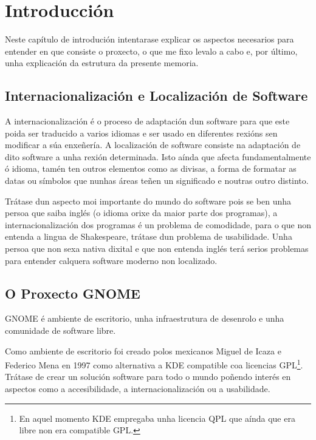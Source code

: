 %
%

\chapter[Introducción]{Introducción}

Neste capítulo de introdución intentarase explicar os aspectos necesarios para entender en que consiste o proxecto, o que me fixo levalo a cabo e, por último, unha explicación da estrutura da presente memoria. 

\section{Internacionalización e Localización de Software}
A internacionalización é o proceso de adaptación dun software para que este poida ser traducido a varios idiomas e ser usado en diferentes rexións sen modificar a súa enxeñería. A localización de software consiste na adaptación de dito software a unha rexión determinada. Isto aínda que afecta fundamentalmente ó idioma, tamén ten outros elementos como as divisas, a forma de formatar as datas ou símbolos que nunhas áreas teñen un significado e noutras outro distinto.

Trátase dun aspecto moi importante do mundo do software pois se ben unha persoa que saiba inglés (o idioma orixe da maior parte dos programas), a internacionalización dos programas é un problema de comodidade, para o que non entenda a lingua de Shakespeare, trátase dun problema de usabilidade. Unha persoa que non sexa nativa dixital e que non entenda inglés terá serios problemas para entender calquera software moderno non localizado.

\section{O Proxecto GNOME}
GNOME é ambiente de escritorio, unha infraestrutura de desenrolo e unha comunidade de software libre.

Como ambiente de escritorio foi creado polos mexicanos Miguel de Icaza e Federico Mena en 1997 como alternativa a KDE compatible coa licencias GPL\footnote{En aquel momento KDE empregaba unha licencia QPL que aínda que era libre non era compatible GPL.}. Trátase de crear un solución software para todo o mundo poñendo interés en aspectos como a accesibilidade, a internacionalización ou a usabilidade.

